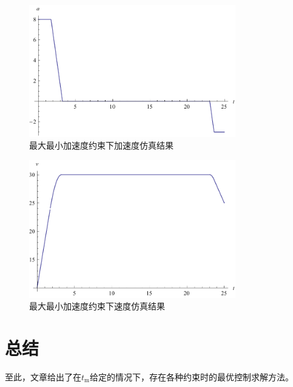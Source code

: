 \begin{figure}[htbp]
\centering
\includegraphics[width=9cm]{figures/uopt/ma.pdf}
\caption{最大最小加速度约束下加速度仿真结果}
\label{fig:amin:ma}
\end{figure}
\begin{figure}[htbp]
\centering
\includegraphics[width=9cm]{figures/uopt/mv.pdf}
\caption{最大最小加速度约束下速度仿真结果}
\label{fig:amin:mv}
\end{figure}

\section{总结}
至此，文章给出了在$t_\mathrm{m}$给定的情况下，存在各种约束时的最优控制求解方法。